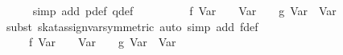 \begin{isabellebody}
\ \ \ \ \isamarkupfalse%
\ {}simp\ add{}\ p{}def\ q{}def{}\isanewline
\ \ \isamarkupfalse%
\ \isamarkupfalse%
\ {}{}{}{}\ {}\ {}\ {}{}\ f\ {}Var\ {}{}{}\ {}\ {}{}\ Var\ {}{}\ {}\ {}{}\ g\ {}Var\ {}{}\ {}Var\ {}{}{}\isanewline
\ \ \ \ \isamarkupfalse%
\ {}subst\ skat{}assign{}{}var{}symmetric{}{}\ {}auto\ simp\ add{}\ f{}def{}\isanewline
\ \ \isamarkupfalse%
\ \isamarkupfalse%
\ {}{}{}{}\ {}\ {}\ {}{}\ f\ {}Var\ {}{}{}\ {}\ {}{}\ Var\ {}{}\ {}\ {}{}\ g\ {}Var\ {}{}\ {}Var\ {}{}{}\isanewline
\ \ \ \ \isamarkupfalse%

\end{isabellebody}

